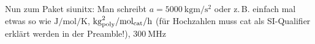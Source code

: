 Nun zum Paket siunitx: Man schreibt $a=\SI{5000}{\kilo\gram\metre\per\square\second}$ oder z.\,B. einfach mal etwas so wie $\si{\joule\per\mole\per\kelvin}$, $\si{\kilo\gram_{poly}\squared\per\mole_{cat}\per\hour}$ (für Hochzahlen muss cat als SI-Qualifier erklärt werden in der Preamble!), $\SI{300}{\MHz}$ 



